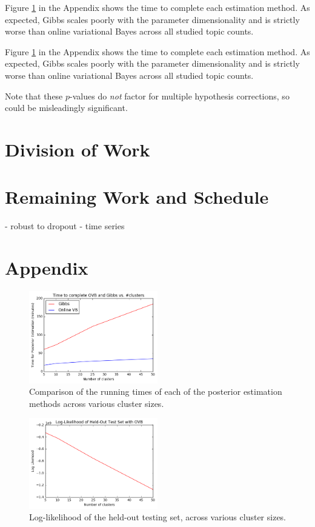 \documentclass[11pt]{article}
\begin{document}
Figure \ref{fig:time} in the Appendix shows the time to complete each estimation method. As expected, Gibbs scales poorly with the parameter dimensionality and is strictly worse than online variational Bayes across all studied topic counts.

Figure \ref{fig:time} in the Appendix shows the time to complete each estimation method. As expected, Gibbs scales poorly with the parameter dimensionality and is strictly worse than online variational Bayes across all studied topic counts.

Note that these $p$-values do \textit{not} factor for multiple hypothesis corrections, so could be misleadingly significant.

\section{Division of Work}

\section{Remaining Work and Schedule}
- robust to dropout
- time series

\section{Appendix}
\begin{figure}
    \label{fig:time}
    \centering
    \includegraphics[width=0.5\textwidth]{time}
    \caption{Comparison of the running times of each of the posterior estimation methods across various cluster sizes.}
\end{figure}

\begin{figure}
    \label{fig:ll}
    \centering
    \includegraphics[width=0.5\textwidth]{ll}
    \caption{Log-likelihood of the held-out testing set, across various cluster sizes.}
\end{figure}
\end{document}
